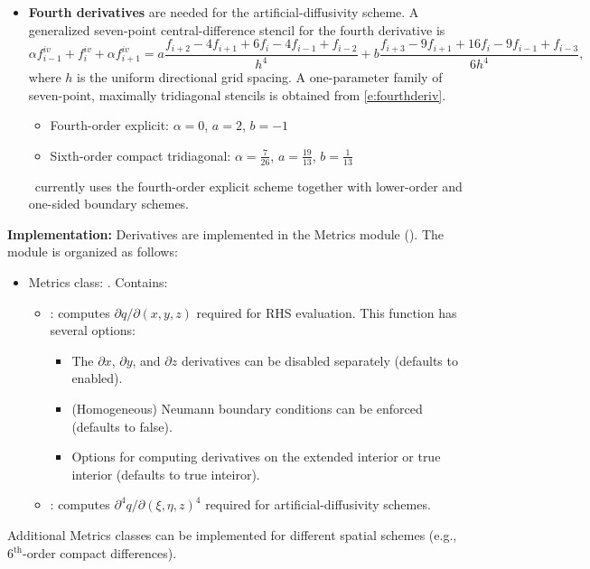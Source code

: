 \documentclass[letterpaper,10pt]{article}
\begin{document}
\begin{itemize}
\item \textbf{Fourth derivatives} are needed for the artificial-diffusivity scheme.  A generalized seven-point central-difference stencil for the fourth derivative is~\cite{Lele1992}
\begin{equation}
  \alpha f^{iv}_{i-1} + f^{iv}_{i} + \alpha f^{iv}_{i+1} = a\frac{f_{i+2} - 4f_{i+1} + 6f_i - 4f_{i-1} + f_{i-2}}{h^4} + b\frac{f_{i+3} - 9f_{i+1} + 16f_i - 9f_{i-1} + f_{i-3}}{6h^4},
  \label{e:fourthderiv}
\end{equation}
where $h$ is the uniform directional grid spacing. A one-parameter family of seven-point, maximally tridiagonal stencils is obtained from \eqref{e:fourthderiv}.
\begin{itemize}
\item {Fourth-order explicit:} $\alpha=0$, $a=2$, $b=-1$
\item {Sixth-order compact tridiagonal:} $\alpha=\frac{7}{26}$, $a=\frac{19}{13}$, $b=\frac{1}{13}$
\end{itemize}
\code\ currently uses the fourth-order explicit scheme together with lower-order and one-sided boundary schemes.

\end{itemize}

\textbf{Implementation:} Derivatives are implemented in the Metrics module (). The module is organized as follows:
\begin{itemize}
\item Metrics class: . Contains:
  \begin{itemize}
  \item {}: computes $\partial q/\partial (x,y,z)$ required for RHS evaluation. This function has several options:
    \begin{itemize}
    \item The $\partial x$, $\partial y$, and $\partial z$ derivatives can be disabled separately (defaults to enabled).
    \item (Homogeneous) Neumann boundary conditions can be enforced (defaults to false).
    \item Options for computing derivatives on the extended interior or true interior (defaults to true inteiror).
    \end{itemize}
  \item {}: computes $\partial^4 q/\partial (\xi,\eta,z)^4$ required for artificial-diffusivity schemes.
  \end{itemize}
\end{itemize}
Additional Metrics classes can be implemented for different spatial schemes (e.g., 6$^\mathrm{th}$-order compact differences).
\end{document}
